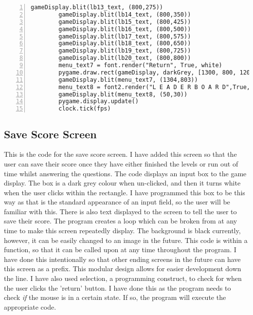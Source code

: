 \documentclass[12pt]{report}
\begin{document}
\begin{Verbatim}[numbers=left, frame=single]
        gameDisplay.blit(lb13_text, (800,275))
        gameDisplay.blit(lb14_text, (800,350))
        gameDisplay.blit(lb15_text, (800,425))
        gameDisplay.blit(lb16_text, (800,500))
        gameDisplay.blit(lb17_text, (800,575))
        gameDisplay.blit(lb18_text, (800,650))
        gameDisplay.blit(lb19_text, (800,725))
        gameDisplay.blit(lb20_text, (800,800))
        menu_text7 = font.render("Return", True, white)
        pygame.draw.rect(gameDisplay, darkGrey, [1300, 800, 120 , 30])
        gameDisplay.blit(menu_text7, (1304,803))
        menu_text8 = font2.render("L E A D E R B O A R D",True,white)
        gameDisplay.blit(menu_text8, (50,30))
        pygame.display.update()                
        clock.tick(fps)
\end{Verbatim}

\pagebreak

\normalsize
\subsection{Save Score Screen}
This is the code for the save score screen. I have added this screen so that the user can save their score once they have either finished the levels or run out of time whilst answering the questions. The code displays an input box to the game display. The box is a dark grey colour when un-clicked, and then it turns white when the user clicks within the rectangle. I have programmed this box to be this way as that is the standard appearance of an input field, so the user will be familiar with this. There is also text displayed to the screen to tell the user to save their score. The program creates a loop which can be broken from at any time to make this screen repeatedly display. The background is black currently, however, it can be easily changed to an image in the future. This code is within a function, so that it can be called upon at any time throughout the program. I have done this intentionally so that other ending screens in the future can have this screen as a prefix. This modular design allows for easier development down the line. I have also used selection, a programming construct, to check for when the user clicks the 'return' button. I have done this as the program needs to check \textit{if} the mouse is in a certain state. If so, the program will execute the appropriate code. 
\end{document}
